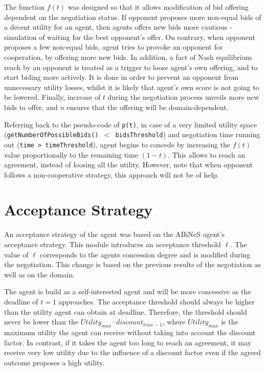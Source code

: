 \documentclass[html]{report}    %
\begin{document}
The function $f(t)$ was designed so that it allows modification of bid offering dependent on the negotiation status. If opponent proposes more non-equal bids of a decent utility for an agent, then agents offers new bids more cautious - simulation of waiting for the best opponent's offer. On contrary, when opponent proposes a few non-equal bids, agent tries to provoke an opponent for cooperation, by offering more new bids. In addition, a fact of Nash equilibrium reach by an opponent is treated as a trigger to loose agent's own offering, and to start biding more actively. It is done in order to prevent an opponent from unnecessary utility losses, whilst it is likely that agent's own score is not going to be lowered. Finally, increase of $t$ during the negotiation process unveils more new bids to offer, and $n$ ensures that the offering will be domain-dependent.

Referring back to the pseudo-code of \texttt{p(t)}, in case of a very limited utility space (\texttt{getNumberOfPossibleBids()~$<$~bidsThreshold}) and negotiation time running out (\texttt{time > timeThreshold}), agent begins to concede by increasing the $f(t)$ value proportionally to the remaining time $(1-t)$. This allows to reach an agreement, instead of loosing all the utility. However, note that when opponent follows a non-cooperative strategy, this approach will not be of help.                

\section{Acceptance Strategy}
              
An acceptance strategy of the agent was based on the ABiNeS agent's ~\cite{abines} acceptance strategy. This module introduces an acceptance threshold $\ell$. The value of $\ell$ corresponds to the agents concession degree and is modified during the negotiation. This change is based on the previous results of the negotiation as well as on the domain.

The agent is build as a self-interested agent and will be more concessive as the deadline of $t=1$ approaches. The acceptance threshold should always be higher than the utility agent can obtain at deadline. Therefore, the threshold should never be lower than the \(Utility_{max}\cdot discount_{time-1}\), where \( Utility_{max}\) is the maximum utility the agent can receive without taking into account the discount factor. In contrast, if it takes the agent too long to reach an agreement, it may receive very low utility due to the influence of a discount factor even if the agreed outcome proposes a high utility. 
\end{document}
